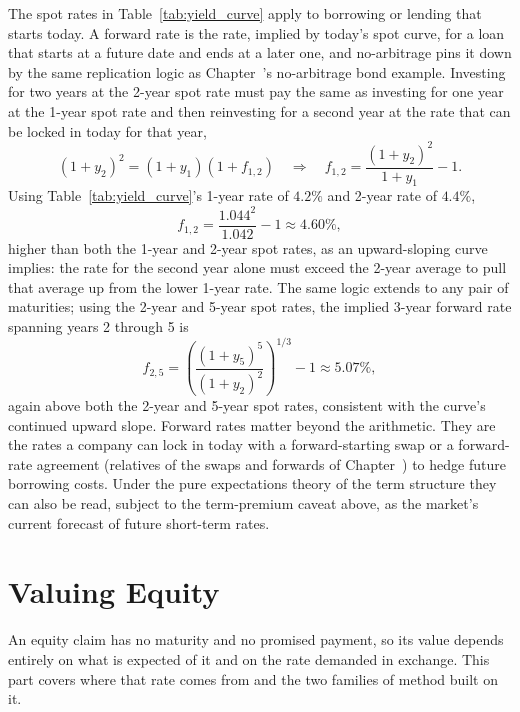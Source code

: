 \documentclass[../ai_in_finance]{subfiles}
\begin{document}
The spot rates in Table~\ref{tab:yield_curve} apply to borrowing or lending that starts today. A forward rate is the rate, implied by today's spot curve, for a loan that starts at a future date and ends at a later one, and no-arbitrage pins it down by the same replication logic as Chapter~'s no-arbitrage bond example. Investing for two years at the 2-year spot rate must pay the same as investing for one year at the 1-year spot rate and then reinvesting for a second year at the rate that can be locked in today for that year,
\begin{equation}
(1+y_2)^2 = (1+y_1)(1+f_{1,2}) \quad\Longrightarrow\quad f_{1,2} = \frac{(1+y_2)^2}{1+y_1} - 1.\label{eq:valuation-forward-rate}
\end{equation}
Using Table~\ref{tab:yield_curve}'s 1-year rate of $4.2\%$ and 2-year rate of $4.4\%$,
\begin{equation*}
f_{1,2} = \frac{1.044^2}{1.042} - 1 \approx 4.60\%,
\end{equation*}
higher than both the 1-year and 2-year spot rates, as an upward-sloping curve implies: the rate for the second year alone must exceed the 2-year average to pull that average up from the lower 1-year rate. The same logic extends to any pair of maturities; using the 2-year and 5-year spot rates, the implied 3-year forward rate spanning years 2 through 5 is
\begin{equation*}
f_{2,5} = \left(\frac{(1+y_5)^5}{(1+y_2)^2}\right)^{1/3} - 1 \approx 5.07\%,
\end{equation*}
again above both the 2-year and 5-year spot rates, consistent with the curve's continued upward slope. Forward rates matter beyond the arithmetic. They are the rates a company can lock in today with a forward-starting swap or a forward-rate agreement (relatives of the swaps and forwards of Chapter~) to hedge future borrowing costs. Under the pure expectations theory of the term structure they can also be read, subject to the term-premium caveat above, as the market's current forecast of future short-term rates.

\section{Valuing Equity}

An equity claim has no maturity and no promised payment, so its value depends entirely on what is expected of it and on the rate demanded in exchange. This part covers where that rate comes from and the two families of method built on it.
\end{document}
